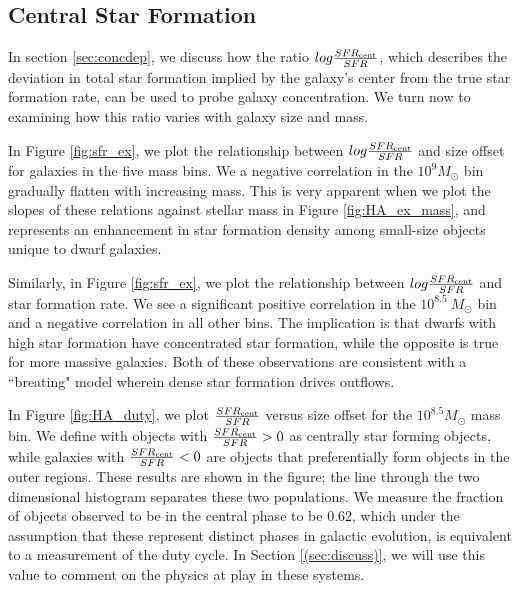 \documentclass[iop]{emulateapj}
\begin{document}
\subsection{Central Star Formation}
\label{sec:conc}

In section \ref{sec:concdep}, we discuss how the ratio $log \frac{SFR_{\rm cent}}{SFR}$, which describes the deviation in total star formation implied by the galaxy's center from the true star formation rate, can be used to probe galaxy concentration. We turn now to examining how this ratio varies with galaxy size and mass.

In Figure \ref{fig:sfr_ex}, we plot the relationship between $log \frac{SFR_{\rm cent}}{SFR}$ and size offset for galaxies in the five mass bins. We a negative correlation in the  $10^{9} M_{\odot}$ bin gradually flatten with increasing mass. This is very apparent when we plot the slopes of these relations against stellar mass in Figure \ref{fig:HA_ex_mass}, and represents an enhancement in star formation density among small-size objects unique to dwarf galaxies.

Similarly, in Figure \ref{fig:sfr_ex}, we plot the relationship between $log \frac{SFR_{\rm cent}}{SFR}$ and star formation rate. We see a significant positive correlation in the $10^{8.5} \ M_{\odot}$ bin and a negative correlation in all other bins. The implication is that dwarfs with high star formation have concentrated star formation, while the opposite is true for more massive galaxies. Both of these observations are consistent with a ``breating" model wherein dense star formation drives outflows.

In Figure \ref{fig:HA_duty}, we plot $\frac{SFR_{\rm cent}}{SFR}$ versus size offset for the $10^{8.5} M_{\odot}$ mass bin. We define with objects with $\frac{SFR_{\rm cent}}{SFR} > 0$ as centrally star forming objects, while galaxies with $\frac{SFR_{\rm cent}}{SFR} < 0$ are objects that preferentially form objects in the outer regions. These results are shown in the figure; the line through the two dimensional histogram separates these two populations. We measure the fraction of objects observed to be in the central phase to be 0.62, which under the assumption that these represent distinct phases in galactic evolution, is equivalent to a measurement of the duty cycle. In Section \ref{(sec:discuss)}, we will use this value to comment on the physics at play in these systems.

	
\end{document}
